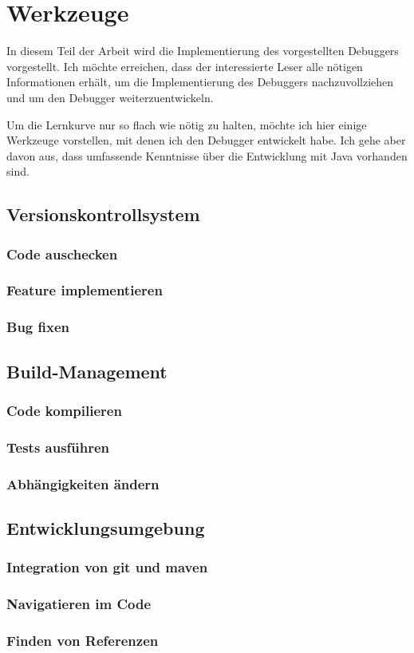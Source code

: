 \chapter{Werkzeuge}
In diesem Teil der Arbeit wird die Implementierung des vorgestellten Debuggers vorgestellt. Ich möchte erreichen, dass der interessierte Leser alle nötigen Informationen erhält, um die Implementierung des Debuggers nachzuvollziehen und um den Debugger weiterzuentwickeln.

Um die Lernkurve nur so flach wie nötig zu halten, möchte ich hier einige Werkzeuge vorstellen, mit denen ich den Debugger entwickelt habe. Ich gehe aber davon aus, dass umfassende Kenntnisse über die Entwicklung mit Java vorhanden sind.

\section{Versionskontrollsystem}
\subsection{Code auschecken}
\subsection{Feature implementieren}
\subsection{Bug fixen}
\section{Build-Management}
\subsection{Code kompilieren}
\subsection{Tests ausführen}
\subsection{Abhängigkeiten ändern}
\section{Entwicklungsumgebung}
\subsection{Integration von git und maven}
\subsection{Navigatieren im Code}
\subsection{Finden von Referenzen}